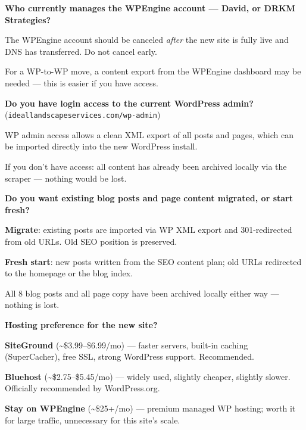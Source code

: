 \documentclass[11pt, letterpaper]{article}
\begin{document}
\begin{checklist}
  \item \textbf{Who currently manages the WPEngine account --- David, or DRKM Strategies?}
    \begin{checklist}
      \item The WPEngine account should be canceled \emph{after} the new site is
            fully live and DNS has transferred. Do not cancel early.
      \item For a WP-to-WP move, a content export from the WPEngine dashboard
            may be needed --- this is easier if you have access.
    \end{checklist}

  \item \textbf{Do you have login access to the current WordPress admin?}
    (\texttt{ideallandscapeservices.com/wp-admin})
    \begin{checklist}
      \item WP admin access allows a clean XML export of all posts and pages,
            which can be imported directly into the new WordPress install.
      \item If you don't have access: all content has already been archived
            locally via the scraper --- nothing would be lost.
    \end{checklist}

  \item \textbf{Do you want existing blog posts and page content migrated,
        or start fresh?}
    \begin{checklist}
      \item \textbf{Migrate}: existing posts are imported via WP XML export and
            301-redirected from old URLs. Old SEO position is preserved.
      \item \textbf{Fresh start}: new posts written from the SEO content plan;
            old URLs redirected to the homepage or the blog index.
      \item All 8 blog posts and all page copy have been archived locally
            either way --- nothing is lost.
    \end{checklist}

  \item \textbf{Hosting preference for the new site?}
    \begin{checklist}
      \item \textbf{SiteGround} (\textasciitilde\$3.99--\$6.99/mo) --- faster
            servers, built-in caching (SuperCacher), free SSL, strong WordPress
            support. Recommended.
      \item \textbf{Bluehost} (\textasciitilde\$2.75--\$5.45/mo) --- widely used,
            slightly cheaper, slightly slower. Officially recommended by WordPress.org.
      \item \textbf{Stay on WPEngine} (\textasciitilde\$25+/mo) --- premium managed
            WP hosting; worth it for large traffic, unnecessary for this site's scale.
    \end{checklist}
\end{checklist}
\end{document}
